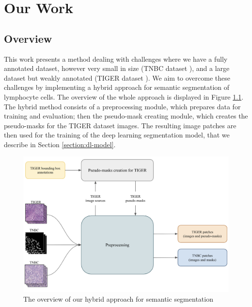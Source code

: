 \chapter{Our Work}
\label{chap:prelim-exp}

\section{Overview}
This work presents a method dealing with challenges where we have a fully annotated dataset, however very small in size (TNBC dataset \cite{TNBC-nuclei-seg-extended}), and a large dataset but weakly annotated (TIGER dataset \cite{tiger_dataset}). We aim to overcome these challenges by implementing a hybrid approach for semantic segmentation of lymphocyte cells. The overview of the whole approach is displayed in Figure \ref{fig:dg-overview}. The hybrid method consists of a preprocessing module, which prepares data for training and evaluation; then the pseudo-mask creating module, which creates the pseudo-masks for the TIGER dataset images. The resulting image patches are then used for the training of the deep learning segmentation model, that we describe in Section \ref{section:dl-model}.

\begin{figure}[H]
\begin{centering}
\includegraphics[width=\textwidth]{assets/images/for_presentation/dg-overview.png}
\par\end{centering}
\caption{The overview of our hybrid approach for semantic segmentation 
\label{fig:dg-overview}}
\end{figure}


